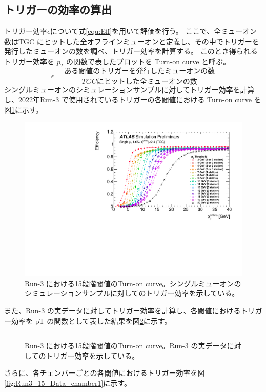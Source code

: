 \subsection{トリガーの効率の算出}
トリガー効率$\epsilon$について式\ref{equ:Eff}を用いて評価を行う。
ここで、全ミューオン数はTGC にヒットした全オフラインミューオンと定義し、その中でトリガーを発行したミューオンの数を調べ、トリガー効率を計算する。
このとき得られるトリガー効率を $p_T$ の関数で表したプロットを Turn-on curve と呼ぶ。
\begin{equation}
　\epsilon=\frac{ある閾値のトリガーを発行したミューオンの数}{TGCにヒットした全ミューオンの数}
　\label{equ:Eff}
\end{equation}
シングルミューオンのシミュレーションサンプルに対してトリガー効率を計算し、2022年Run-3 で使用されているトリガーの各閾値における Turn-on curve を図\ref{fig:Run3_15_MC}に示す。
\begin{figure}[tb]
  \centering
  \includegraphics[clip, width=15cm]{fig/3/PLOT-TRIG-2020-01-fig1.pdf}
  \caption{Run-3 における15段階閾値のTurn-on curve。シングルミューオンのシミュレーションサンプルに対してのトリガー効率を示している。}
  \label{fig:Run3_15_MC}
\end{figure}
また、Run-3 の実データに対してトリガー効率を計算し、各閾値におけるトリガー効率を pT の関数として表した結果を図\ref{fig:Run3_15_Data}に示す。
\begin{figure}[tb]
  \centering
  \rule{8cm}{6cm}
  \caption{Run-3 における15段階閾値のTurn-on curve。Run-3 の実データに対してのトリガー効率を示している。}
  \label{fig:Run3_15_Data}
\end{figure}
さらに、各チェンバーごとの各閾値におけるトリガー効率を図\ref{fig:Run3_15_Data_chamber1}に示す。
